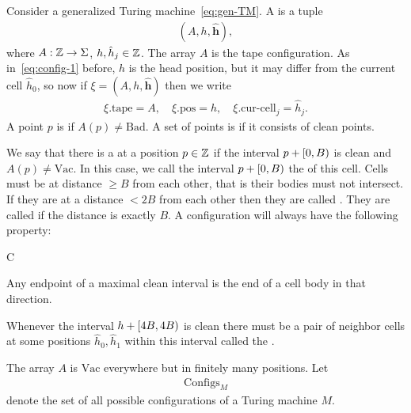\documentclass[11pt]{memoir}
\theoremstyle{definition} %
\renewcommand{\ge}{\geq}
\renewcommand{\vek}[1]{\mathbf{#1}}
\newcommand{\fld}[1]{\ensuremath{\textit{#1\/}}}
\def\B{B}
\newcommand{\Bad}{\mathrm{Bad}}
\newcommand{\Vacant}{\mathrm{Vac}}
\newcommand{\Configs}{\mathrm{Configs}}
\newcommand{\h}{h}
\newcommand{\hc}{\hat h}
\newcommand{\vhc}{\vek{\hat h}}
\newcommand{\pos}{\mathrm{pos}}
\newcommand{\curcell}{\textrm{cur-cell}}
\newcommand{\cDir}{\fld{cDir}}
\newcommand{\tape}{\mathrm{tape}}
\begin{document}
\begin{definition}[Configuration]\label{def:config}
     Consider a generalized Turing machine~\eqref{eq:gen-TM}.
    A  is a tuple
        \begin{align*}
             (A,\h,\vhc),
        \end{align*}
where \( A:\mathbb{Z}\to\Sigma \), \( \h,\hc_{j}\in\bbZ \).
The array \( A \) is the tape configuration.
As in~\eqref{eq:config-1} before, \( \h \) is the head position, but it may differ from the current cell
\( \hc_{0} \), so now if \(  \xi= (A,\h,\vhc) \) then we write
        \begin{align}\label{eq:config-2}
             \xi.\tape=A, \quad \xi.\pos=\h,\quad \xi.\curcell_{j}=\hc_{j}. 
        \end{align}
A point \( p \) is  if  \( A(p)\ne\Bad \).
A set of points is  if it consists of clean points.

We say that there is a  at a position \( p\in\mathbb{Z} \) if the interval
\( p+\lint{0}{\B} \) is clean and \( A(p)\ne \Vacant \).
In this case, we call the interval \( p+\lint{0}{\B} \) the  of this cell.
Cells must be at distance \( \ge\B \) from each other, that is their
bodies must not intersect.
If they are at a distance \( <2\B \) from each other then they are called .
They are called  if the distance is exactly \( \B \).
A configuration will always have the following property:
\begin{varenum}{C}
\item\label{i:config.sharp-ends}
 Any endpoint of a maximal clean interval is the end of a cell body in that direction.
\end{varenum}
Whenever the interval \( \h+\lint{4\B}{4\B} \) is clean there must be a
pair of neighbor cells at some positions \( \hc_{0},\hc_{1} \) within
this interval called the .

The array \( A \) is \( \Vacant \) everywhere but in finitely many positions.
Let
    \begin{align*}
         \Configs_{M}
    \end{align*}
    denote the set of all possible configurations of a Turing machine \( M \).
\end{definition}
\end{document}
